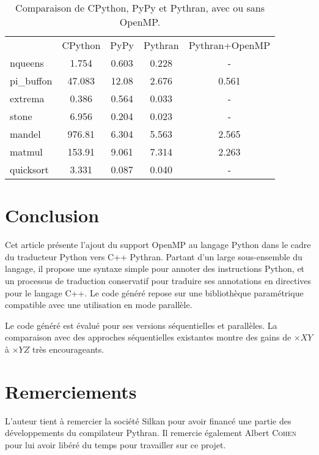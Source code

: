 \documentclass[renpar]{compas2013}
\begin{document}
\begin{table}
  \begin{tabular}{|l|c|c|c|c|}
				&CPython	&	PyPy	&	Pythran	&	Pythran+OpenMP\\
	nqueens		&1.754		&	0.603	&	0.228	&	-		  \\
	pi\_buffon	&47.083		&	12.08	&	2.676	&	0.561		\\
	extrema		&0.386		&	0.564	&	0.033	&	-\\
	stone		&6.956		&	0.204	&	0.023	&	-\\
	mandel		&976.81		&	6.304	&	5.563	&	2.565\\
	matmul		&153.91		&	9.061	&	7.314	&	2.263\\
	quicksort	&3.331		&	0.087	&	0.040	&	-\\
  \end{tabular}

  \caption{Comparaison de CPython, PyPy et Pythran, avec ou sans OpenMP.}
  \label{tbl:pythran-vs-cpython}
\end{table}

\section{Conclusion}

Cet article présente l'ajout du support OpenMP au langage Python dans le
cadre du traducteur Python vers C++ Pythran. Partant d'un large
sous-ensemble du langage, il propose une syntaxe simple pour annoter des
instructions Python, et un processus de traduction conservatif pour
traduire ses annotations en directives pour le langage C++. Le code généré
repose sur une bibliothèque paramétrique compatible avec une utilisation
en mode parallèle.

Le code généré est évalué pour ses versions séquentielles et parallèles. La
comparaison avec des approches séquentielles existantes montre des gains
de $\times XY$ à $\times YZ$ très encourageants.



\section{Remerciements}

L'auteur tient à remercier la société Silkan pour avoir financé une partie des
développements du compilateur Pythran. Il remercie également Albert
\textsc{Cohen} pour lui avoir libéré du temps pour travailler sur ce projet.
\end{document}
